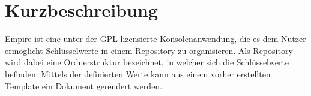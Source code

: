 
\section{Kurzbeschreibung}

Empire ist eine unter der GPL lizensierte Konsolenanwendung, die es dem Nutzer ermöglicht Schlüsselwerte in einem Repository zu organisieren. Als Repository wird dabei eine Ordnerstruktur bezeichnet, in welcher sich die Schlüsselwerte befinden.
Mittels der definierten Werte kann aus einem vorher erstellten Template ein Dokument gerendert werden.
